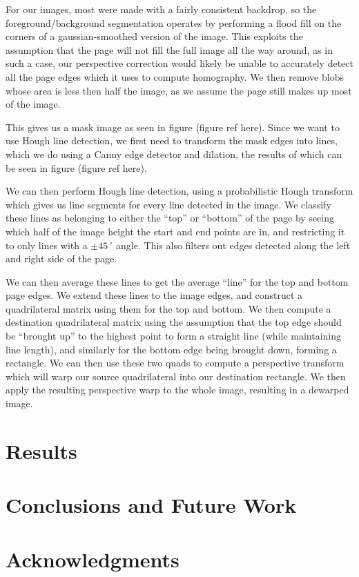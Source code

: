 \documentclass[runningheads,a4paper]{llncs}
\begin{document}
For our images, most were made with a fairly consistent backdrop, so the foreground/background segmentation operates by performing a flood fill on the corners of a gaussian-smoothed version of the image. This exploits the assumption that the page will not fill the full image all the way around, as in such a case, our perspective correction would likely be unable to accurately detect all the page edges which it uses to compute homography. We then remove blobs whose area is less then half the image, as we assume the page still makes up most of the image. 

This gives us a mask image as seen in figure (figure ref here). Since we want to use Hough line detection, we first need to transform the mask edges into lines, which we do using a Canny edge detector and dilation, the results of which can be seen in figure (figure ref here).

We can then perform Hough line detection, using a probabilistic Hough transform which gives us line segments for every line detected in the image. We classify these lines as belonging to either the “top” or “bottom” of the page by seeing which half of the image height the start and end points are in, and restricting it to only lines with a $\pm 45\,^{\circ}$ angle. This also filters out edges detected along the left and right side of the page.

We can then average these lines to get the average “line” for the top and bottom page edges. We extend these lines to the image edges, and construct a quadrilateral matrix using them for the top and bottom. We then compute a destination quadrilateral matrix using the assumption that the top edge should be “brought up” to the highest point to form a straight line (while maintaining line length), and similarly for the bottom edge being brought down, forming a rectangle. We can then use these two quads to compute a perspective transform which will warp our source quadrilateral into our destination rectangle. We then apply the resulting perspective warp to the whole image, resulting in a dewarped image.

\section{Results}

\section{Conclusions and Future Work}

\section{Acknowledgments}



\end{document}
